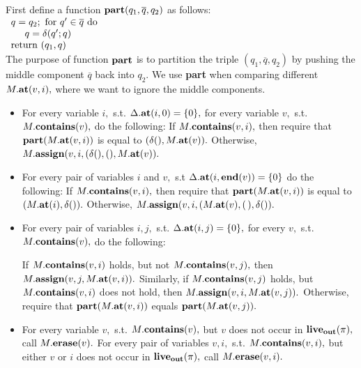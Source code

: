 \begin{definition}
   \label{Def_postproc}
   First define a function $ {\bf part}( q_1, \overline{q}, q_2 ) $ as
   follows: \\ 
   \hspace*{0.5cm}
   $ 
         \begin{array}{l}
            q = q_2; \ 
            \mbox{for} \ q' \in \overline{q} \mbox{ do} \\
            \hspace*{0.5cm}
               q = \delta( q'; q ) \\
            {\rm return} \ ( q_1, q ) 
         \end{array}
   $ \\ 
   The purpose of function $ {\bf part} $ is to partition
   the triple $ (q_1, \overline{q}, q_2) $ by pushing the middle component
   $ \overline{q} $ back into $ q_2. $ We use {\bf part} when
   comparing different $ M. {\bf at}(v,i), $ where we want
   to ignore the middle components.
   \begin{itemize}
   \item
      For every variable $ i, $ s.t.
      $ \Delta. {\bf at}(i,0) = \{ 0 \}, $ for every variable $ v, $
      s.t. $ M. {\bf contains}(v), $ do the following: 
      If $ M.{\bf contains}(v,i), $ then 
      require that $ {\bf part}( M. {\bf at}(v,i)) $ is equal to
      $ ( \delta( ), M. {\bf at}(v)). $ 
      Otherwise, $ M. {\bf assign}(v,i, ( \delta( ), ( ), M. {\bf at}(v)). $ 
   \item
      For every pair of variables $ i $ and $ v, $ s.t 
      $ \Delta. {\bf at}(i, {\bf end}(v)) = \{ 0 \} $ do the following:
      If $ M. {\bf contains}(v,i), $ then require that
      $ {\bf part}( M. {\bf at}(v,i)) $ is equal to
      $ ( M. {\bf at}(i), \delta()). $
      Otherwise,  
      $ M. {\bf assign}( v,i, ( M. {\bf at}(v), ( \, ), \delta( )). $ 
   \item
      For every pair of variables $ i, j, $ s.t.
      $ \Delta.{\bf at}(i,j) = \{ 0 \}, $ for every
      $ v, $ s.t. $ M. {\bf contains}(v), $ do the following:

      If $ M. {\bf contains}(v,i) $ holds, but not
         $ M. {\bf contains}(v,j), $ then 
      $ M. {\bf assign}(v,j, M. {\bf at}(v,i)). $ 
      Similarly, if
      $ M. {\bf contains}(v,j) $ holds, but
      $ M. {\bf contains}(v,i) $ does not hold, then
      $ M. {\bf assign}(v,i, M. {\bf at}(v,j)). $
      Otherwise, require that 
      $ {\bf part}( M. {\bf at}(v,i)) $ equals 
      $ {\bf part}( M. {\bf at}(v,j)). $ 
   \item
      For every variable $ v, $ s.t. $ M. {\bf contains}(v), $ 
      but $ v $ does not occur in $ {\bf live}_{\bf out}( \pi ), $
      call $ M. {\bf erase}(v). $
      For every pair of variables $ v,i, $ s.t.
      $ M. {\bf contains}(v,i), $ but
      either $ v $ or $ i $ does not occur in $ {\bf live}_{\bf out}(\pi), $
      call $ M. {\bf erase}(v,i). $
   \end{itemize}
\end{definition}
